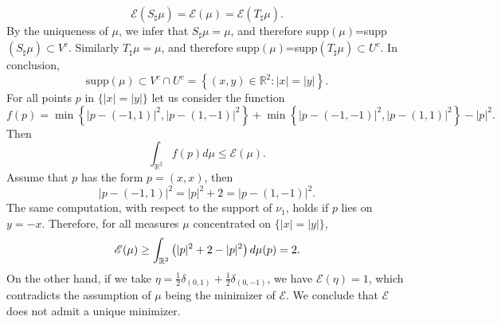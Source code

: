 \documentclass[12pt,a4paper]{article}
\newcommand{\R}{\mathbb{R}}
\renewcommand{\d}{{\rm d}}
\theoremstyle{plain}
\theoremstyle{definition}
\begin{document}
\[
	\mathscr E(S_\sharp \mu)  = \mathscr E(\mu) =	\mathscr E(T_\sharp \mu).
\]
By the uniqueness of $\mu$, we infer that $S_\sharp \mu = \mu$, and therefore supp$(\mu)$=supp$(S_\sharp \mu)\subset V^c$. Similarly $T_\sharp \mu = \mu$, and therefore supp$(\mu)$=supp$(T_\sharp \mu)\subset U^c$. In conclusion,
\[
	\text{supp}(\mu)\subset V^c \cap U^c = \left\{ (x,y)\in \R^2 : |x| = |y|\right\}.
\]
For all points $p$ in $\{|x| = |y| \}$ let us consider the function 
\[
	f(p) = \min \left\{|p - (-1,1)|^2, |p-(1,-1)|^2 \right\} + \min \left\{|p - (-1,-1)|^2, |p-(1,1)|^2 \right\} - |p|^2.
\]	 
Then 
\[
	\int_{\R^2} f(p) d\mu \leq \mathscr{E}(\mu).
\]
Assume that $p$ has the form $p=(x,x)$, then
\[
	|p - (-1,1)|^2 =  |p|^2 +2 = |p-(1,-1)|^2.
\]
The same computation, with respect to the support of $\nu_1$, holds if $p$ lies on $y=-x$. Therefore, for all measures $\mu$ concentrated on $\{|x| = |y| \}$, 
\[
	\mathscr{E}(\mu) \geq \int_{\R^2}\left( |p|^2+2-|p|^2\right)\d\mu(p)=2.
\]	
On the other hand, if we take $\eta = \frac12 \delta_{(0,1)} + \frac12 \delta_{(0,-1)}$, we have $\mathscr{E}(\eta) = 1$, which contradicts the assumption of $\mu$ being the minimizer of $\mathscr{E}$. We conclude that $\mathscr E$ does not admit a unique minimizer.


\end{document}
